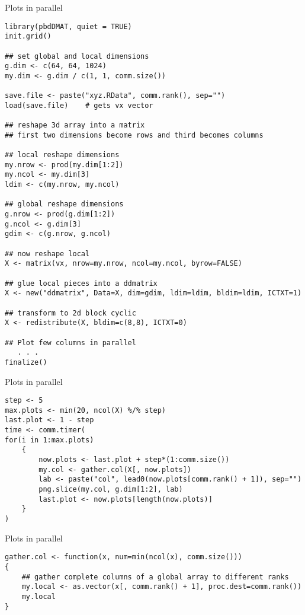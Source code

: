 \begin{frame}
  \begin{exampleblock}{Plots in parallel}\pause
\begin{lstlisting}[title=Get and Redistribute the Data]
library(pbdDMAT, quiet = TRUE)
init.grid()

## set global and local dimensions
g.dim <- c(64, 64, 1024)
my.dim <- g.dim / c(1, 1, comm.size())

save.file <- paste("xyz.RData", comm.rank(), sep="")
load(save.file)    # gets vx vector

## reshape 3d array into a matrix
## first two dimensions become rows and third becomes columns

## local reshape dimensions
my.nrow <- prod(my.dim[1:2])
my.ncol <- my.dim[3]
ldim <- c(my.nrow, my.ncol)

## global reshape dimensions
g.nrow <- prod(g.dim[1:2])
g.ncol <- g.dim[3]
gdim <- c(g.nrow, g.ncol)

## now reshape local
X <- matrix(vx, nrow=my.nrow, ncol=my.ncol, byrow=FALSE)

## glue local pieces into a ddmatrix
X <- new("ddmatrix", Data=X, dim=gdim, ldim=ldim, bldim=ldim, ICTXT=1)

## transform to 2d block cyclic
X <- redistribute(X, bldim=c(8,8), ICTXT=0)

## Plot few columns in parallel
   . . .
finalize()
\end{lstlisting}
  \end{exampleblock}
\end{frame}

\begin{frame}
  \begin{exampleblock}{Plots in parallel}\pause
\begin{lstlisting}[title=Make comm.size() plots in parallel]
step <- 5
max.plots <- min(20, ncol(X) %/% step)
last.plot <- 1 - step
time <- comm.timer(
for(i in 1:max.plots)
    {
        now.plots <- last.plot + step*(1:comm.size())
        my.col <- gather.col(X[, now.plots])
        lab <- paste("col", lead0(now.plots[comm.rank() + 1]), sep="")
        png.slice(my.col, g.dim[1:2], lab)
        last.plot <- now.plots[length(now.plots)]
    }
)
\end{lstlisting}
  \end{exampleblock}
\end{frame}

\begin{frame}
  \begin{exampleblock}{Plots in parallel}\pause
\begin{lstlisting}[title=gather.col First Attempt (1\_plot.r)]
gather.col <- function(x, num=min(ncol(x), comm.size()))
{
    ## gather complete columns of a global array to different ranks
    my.local <- as.vector(x[, comm.rank() + 1], proc.dest=comm.rank())
    my.local
}
\end{lstlisting}
  \end{exampleblock}
\end{frame}

